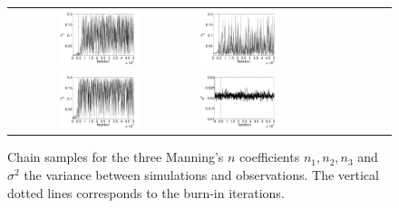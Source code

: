 \begin{figure}[ht]
\begin{tabular}{clc}
\includegraphics[width=0.475\textwidth]{./figures/chain_p1.pdf} &
\includegraphics[width=0.475\textwidth]{./figures/chain_p2.pdf} \\
\includegraphics[width=0.475\textwidth]{./figures/chain_p3.pdf} &
\includegraphics[width=0.475\textwidth]{./figures/chain_s1.pdf}
\end{tabular}
\caption{Chain samples for the three Manning's $n$ coefficients $n_1,n_2,n_3$ and $\sigma^2$
the variance between simulations and observations. The vertical dotted lines corresponds to the
burn-in iterations.}
\label{fig:mcmc} 
\end{figure}

